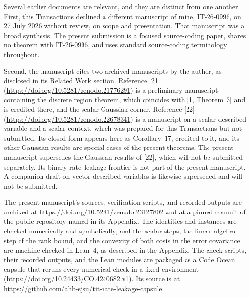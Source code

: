 \documentclass[11pt]{article}
\begin{document}
Several earlier documents are relevant, and they are distinct from one
another. First, this Transactions declined a different manuscript of
mine, IT-26-0996, on 27 July 2026 without review, on scope and
presentation. That manuscript was a broad synthesis. The present submission is a
focused source-coding paper, shares no theorem with IT-26-0996, and uses
standard source-coding terminology throughout.

Second, the manuscript cites two archived manuscripts by the author, as
disclosed in its Related Work section. Reference [21]
(\url{https://doi.org/10.5281/zenodo.21776291}) is a preliminary manuscript containing the
discrete region theorem, which coincides with [1, Theorem~3] and is
credited there, and the scalar Gaussian corner. Reference [22]
(\url{https://doi.org/10.5281/zenodo.22678341}) is a manuscript on a scalar described
variable and a scalar context, which was prepared for this Transactions
but not submitted. Its closed form appears here as Corollary~17, credited
to it, and its other Gaussian results are special cases of the present
theorems. The present manuscript supersedes the Gaussian results of [22],
which will not be submitted separately. Its binary rate--leakage frontier
is not part of the present manuscript. A companion draft on vector
described variables is likewise superseded and will not be submitted.

The present manuscript's sources, verification scripts, and recorded
outputs are archived at \url{https://doi.org/10.5281/zenodo.23127802} and at a pinned
commit of the public repository named in its Appendix. The identities
and instances are checked numerically and symbolically, and the scalar
steps, the linear-algebra step of the rank bound, and the convexity of
both costs in the error covariance are machine-checked in Lean~4, as
described in the Appendix. The check scripts, their recorded outputs,
and the Lean modules are packaged as a Code Ocean capsule that reruns
every numerical check in a fixed environment
(\url{https://doi.org/10.24433/CO.4240682.v1}). Its source is at
\url{https://github.com/ahb-sjsu/tit-rate-leakage-capsule}.
\end{document}
